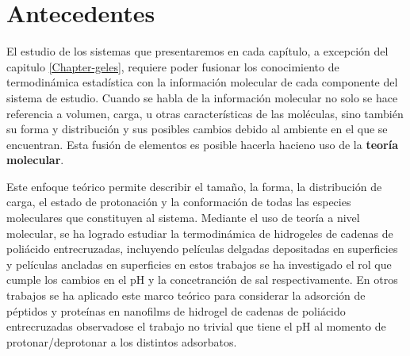 \section{Antecedentes}

El estudio de los sistemas que presentaremos en cada cap\'itulo, a excepci\'on del capitulo \ref{Chapter-geles}, requiere poder fusionar los conocimiento de termodin\'amica estad\'istica con la informaci\'on molecular de cada componente del sistema de estudio. Cuando se habla de la informaci\'on molecular no solo se hace referencia a volumen, carga, u otras caracter\'isticas de las mol\'eculas, sino tambi\'en su forma y  distribuci\'on y  sus posibles cambios debido al ambiente en el que se encuentran. Esta fusi\'on de elementos es posible hacerla hacieno uso de la {\bf teor\'ia molecular}.

Este enfoque te\'orico permite describir el tama\~no, la forma, la distribuci\'on de carga, el estado de protonaci\'on y la conformaci\'on de todas las especies moleculares que constituyen al sistema. 
Mediante el uso de teor\'ia a nivel molecular, se ha logrado estudiar la termodin\'amica de hidrogeles de cadenas de poli\'acido entrecruzadas, incluyendo pel\'iculas delgadas depositadas en superficies \cite{longo2012molecular} y pel\'iculas ancladas en superficies \cite{longo2014non} en estos trabajos se ha investigado el rol que cumple los cambios en el pH y la concetranci\'on de sal respectivamente. En otros trabajos se ha aplicado este marco te\'orico para considerar la adsorci\'on de p\'eptidos y prote\'inas en nanofilms de hidrogel de cadenas de poli\'acido entrecruzadas \cite{longo2014equilibrium,narambuena2015lysozyme,longo2016adsorption} observadose el trabajo no trivial que tiene el pH al momento de protonar/deprotonar a los distintos adsorbatos. 

